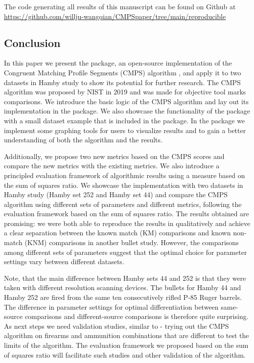 The code generating all results of this manuscript can be found on
Github at
\url{https://github.com/willju-wangqian/CMPSpaper/tree/main/reproducible}

\hypertarget{conclusion}{%
\subsection{Conclusion}\label{conclusion}}

In this paper we present the  package, an open-source
implementation of the Congruent Matching Profile Segments (CMPS)
algorithm \citep{cmps}, and apply it to two datasets in Hamby study
\citep{hamby} to show its potential for further research. The CMPS
algorithm was proposed by NIST in 2019 and was made for objective tool
marks comparisons. We introduce the basic logic of the CMPS algorithm
and lay out its implementation in the  package. We also
showcase the functionality of the  package with a small
dataset example that is included in the package. In the 
package we implement some graphing tools for users to visualize results
and to gain a better understanding of both the algorithm and the
results.

Additionally, we propose two new metrics based on the CMPS scores and
compare the new metrics with the existing metrics. We also introduce a
principled evaluation framework of algorithmic results using a measure
based on the sum of squares ratio. We showcase the implementation with
two datasets in Hamby study (Hamby set 252 and Hamby set 44) and compare
the CMPS algorithm using different sets of parameters and different
metrics, following the evaluation framework based on the sum of squares
ratio. The results obtained are promising: we were both able to
reproduce the results in \citet{cmps} qualitatively and achieve a clear
separation between the known match (KM) comparisons and known non-match
(KNM) comparisons in another bullet study. However, the comparisons
among different sets of parameters suggest that the optimal choice for
parameter settings vary between different datasets.

Note, that the main difference between Hamby sets 44 and 252 is that
they were taken with different resolution scanning devices. The bullets
for Hamby 44 and Hamby 252 are fired from the same ten consecutively
rifled P-85 Ruger barrels. The difference in parameter settings for
optimal differentiation between same-source comparisons and
different-source comparisons is therefore quite surprising. As next
steps we need validation studies, similar to \citet{vanderplas} - trying
out the CMPS algorithm on firearms and ammunition combinations that are
different to test the limits of the algorithm. The evaluation framework
we proposed based on the sum of squares ratio will facilitate such
studies and other validation of the algorithm.


